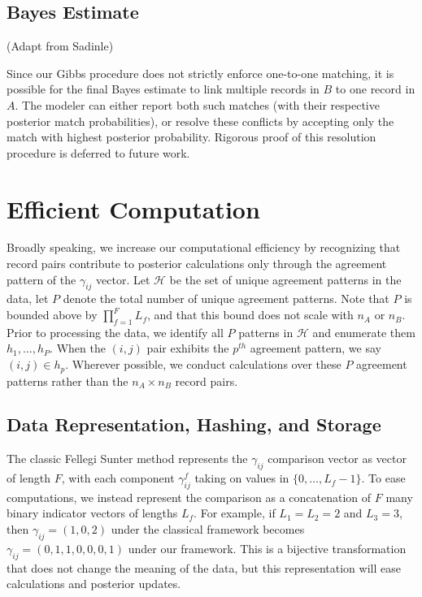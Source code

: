 \documentclass[
  12pt,
]{article}
\begin{document}
\hypertarget{bayes-estimate}{%
\subsection{Bayes Estimate}\label{bayes-estimate}}

(Adapt from Sadinle)

Since our Gibbs procedure does not strictly enforce one-to-one matching,
it is possible for the final Bayes estimate to link multiple records in
\(B\) to one record in \(A\). The modeler can either report both such
matches (with their respective posterior match probabilities), or
resolve these conflicts by accepting only the match with highest
posterior probability. Rigorous proof of this resolution procedure is
deferred to future work.

\hypertarget{efficient-computation}{%
\section{Efficient Computation}\label{efficient-computation}}

Broadly speaking, we increase our computational efficiency by
recognizing that record pairs contribute to posterior calculations only
through the agreement pattern of the \(\gamma_{ij}\) vector. Let
\(\mathcal{H}\) be the set of unique agreement patterns in the data, let
\(P\) denote the total number of unique agreement patterns. Note that
\(P\) is bounded above by \(\prod_{f=1}^F L_f\), and that this bound
does not scale with \(n_A\) or \(n_B\). Prior to processing the data, we
identify all \(P\) patterns in \(\mathcal{H}\) and enumerate them
\(h_1, \ldots, h_P\). When the \((i,j)\) pair exhibits the \(p^{th}\)
agreement pattern, we say \((i,j) \in h_p\). Wherever possible, we
conduct calculations over these \(P\) agreement patterns rather than the
\(n_A \times n_B\) record pairs.

\hypertarget{data-representation-hashing-and-storage}{%
\subsection{Data Representation, Hashing, and
Storage}\label{data-representation-hashing-and-storage}}

The classic Fellegi Sunter method represents the \(\gamma_{ij}\)
comparison vector as vector of length \(F\), with each component
\(\gamma_{ij}^f\) taking on values in \(\{0, \ldots, L_f - 1\}\). To
ease computations, we instead represent the comparison as a
concatenation of \(F\) many binary indicator vectors of lengths \(L_f\).
For example, if \(L_1 = L_2 = 2\) and \(L_3 = 3\), then
\(\gamma_{ij} = (1, 0, 2)\) under the classical framework becomes
\(\gamma_{ij} = (0, 1, 1, 0, 0, 0, 1)\) under our framework. This is a
bijective transformation that does not change the meaning of the data,
but this representation will ease calculations and posterior updates.
\end{document}

